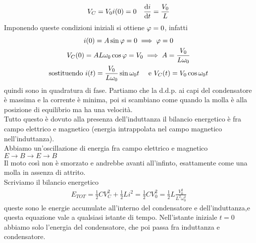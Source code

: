 \begin{align*}
	V_C=V_0 & i(0)=0 & \dv{i}{t}(0)=\frac{V_0}{L}
\end{align*}
Imponendo queste condizioni iniziali si ottiene $\oldphi=0$, infatti
\begin{gather*}
	i(0)=A\sin\oldphi=0 \implies \oldphi=0\\
	V_C(0)=AL\omega_0 \cos\oldphi=V_0 \implies A=\frac{V_0}{L\omega_0}\\
	\text{sostituendo } i(t)=\frac{V_0}{L\omega_0}\sin\omega_0 t \quad \text{ e } V_C(t)=V_0\cos\omega_0 t
\end{gather*}
quindi sono in quadratura di fase.
Partiamo che la d.d.p. ai capi del condensatore è massima e la corrente è minima, poi si scambiano come quando la molla è alla posizione di equilibrio ma ha una velocità.\\
Tutto questo è dovuto alla presenza dell'induttanza
il bilancio energetico è fra campo elettrico e magnetico (energia intrappolata nel campo magnetico nell'induttanza).\\
Abbiamo un'oscillazione di energia fra campo elettrico e magnetico $E\rightarrow B\rightarrow E\rightarrow B$\\
Il moto così non è smorzato e andrebbe avanti all'infinto, esattamente come una molla in assenza di attrito.\\
Scriviamo il bilancio energetico
\begin{gather*}
	E_{TOT}=\frac{1}{2}CV_C^2 +\frac{1}{2}Li^2= \frac{1}{2}CV_0^2=\frac{1}{2}L\frac{V_0^2}{L^2\omega_0^2}
\end{gather*}
queste sono le energie accumulate all'interno del condensatore e dell'induttanza,e questa equazione vale a qualsiasi istante di tempo. Nell'istante iniziale $t=0$ abbiamo solo l'energia del condensatore, che poi passa fra induttanza e condensatore.\\

